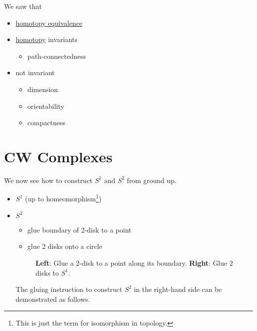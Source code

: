 \begin{prev}
	We saw that
	\begin{itemize}
		\item \hyperref[def:homotopy-equivalence]{homotopy equivalence}
		\item \hyperref[def:homotopy]{homotopy} invariants
		      \begin{itemize}
			      \item path-connectedness
		      \end{itemize}
		\item not invariant
		      \begin{itemize}
			      \item dimension
			      \item orientability
			      \item compactness
		      \end{itemize}
	\end{itemize}
\end{prev}

\section{CW Complexes}

\begin{eg}
	We now see how to construct \(S^1\) and \(S^2\) from ground up.
	\begin{itemize}
		\item \(S^1\) (up to homeomorphism\footnote{This is just the term for isomorphism in topology.})
		      \begin{center}
		      \end{center}
		\item \(S^2\)
		      \begin{itemize}
			      \item glue boundary of 2-disk to a point
			      \item glue 2 disks onto a circle
		      \end{itemize}
		      \begin{figure}[H]
			      \centering
			      \caption{\textbf{Left}: Glue a \(2\)-disk to a point along its boundary. \textbf{Right}: Glue \(2\) disks to \(S^1\).}
			      \label{fig:eg:constructing-sphere-2}
		      \end{figure}
		      The gluing instruction to construct \(S^2\) in the right-hand side can be demonstrated as follows.
		      \begin{center}
		      \end{center}
	\end{itemize}
\end{eg}

